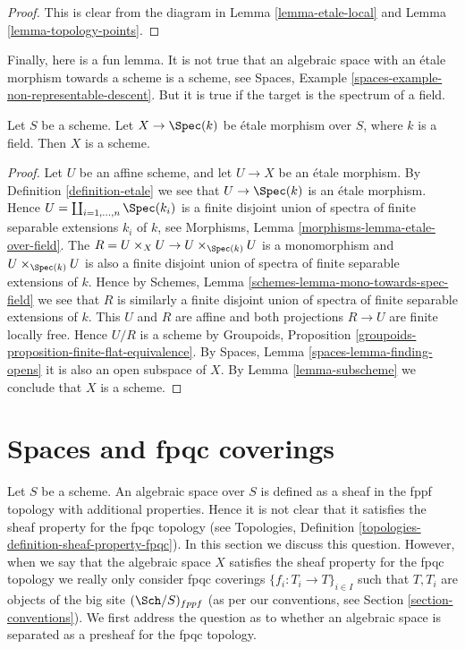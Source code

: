 \begin{proof}
This is clear from the diagram in
Lemma \ref{lemma-etale-local}
and
Lemma \ref{lemma-topology-points}.
\end{proof}

\noindent
Finally, here is a fun lemma. It is not true that an algebraic space
with an \'etale morphism towards a scheme is a scheme, see
Spaces, Example \ref{spaces-example-non-representable-descent}.
But it is true if the target is the spectrum of a field.

\begin{lemma}
\label{lemma-etale-over-field-scheme}
Let $S$ be a scheme. Let $X \to \Spec(k)$
be \'etale morphism over $S$, where $k$ is a field.
Then $X$ is a scheme.
\end{lemma}

\begin{proof}
Let $U$ be an affine scheme, and let $U \to X$ be an \'etale morphism. By
Definition \ref{definition-etale}
we see that $U \to \Spec(k)$ is an \'etale
morphism. Hence $U = \coprod_{i = 1, \ldots, n} \Spec(k_i)$
is a finite disjoint union of spectra of finite separable extensions
$k_i$ of $k$, see
Morphisms, Lemma \ref{morphisms-lemma-etale-over-field}.
The $R = U \times_X U \to U \times_{\Spec(k)} U$ is a monomorphism
and $U \times_{\Spec(k)} U$ is also a finite disjoint union of
spectra of finite separable extensions of $k$. Hence by
Schemes, Lemma \ref{schemes-lemma-mono-towards-spec-field}
we see that $R$ is similarly a finite disjoint union of
spectra of finite separable extensions of $k$.
This $U$ and $R$ are affine and
both projections $R \to U$ are finite locally free.
Hence $U/R$ is a scheme by
Groupoids, Proposition \ref{groupoids-proposition-finite-flat-equivalence}.
By
Spaces, Lemma \ref{spaces-lemma-finding-opens}
it is also an open subspace of $X$. By
Lemma \ref{lemma-subscheme}
we conclude that $X$ is a scheme.
\end{proof}













\section{Spaces and fpqc coverings}
\label{section-fpqc}

\noindent
Let $S$ be a scheme.
An algebraic space over $S$ is defined as a sheaf in the fppf topology with
additional properties. Hence it is not clear that it satisfies the sheaf
property for the fpqc topology (see
Topologies, Definition \ref{topologies-definition-sheaf-property-fpqc}).
In this section we discuss this question. However, when we say that
the algebraic space $X$ satisfies the sheaf property for the fpqc topology
we really only consider fpqc coverings $\{f_i : T_i \to T\}_{i \in I}$ such
that $T, T_i$ are objects of the big site $(\Sch/S)_{fppf}$ (as per
our conventions, see Section \ref{section-conventions}). We first address the
question as to whether an algebraic space is separated as a presheaf for the
fpqc topology.


